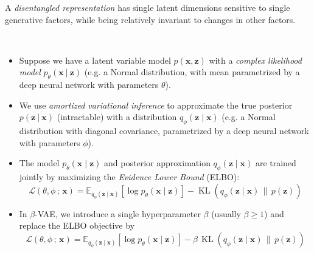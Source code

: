 \documentclass[a0]{a0poster}
\DeclareMathOperator{\KL}{KL}
\def\Head#1{\begin{center}\noindent{\LARGE\bf\color{Black}#1}\end{center}\bigskip}
\begin{document}
\begin{minipage}[t]{0.32\textwidth}
    \Head{Background}
    \vspace{1cm}
    \begin{minipage}{1.0\columnwidth}
    \Large
    A \emph{disentangled representation} has single latent dimensions sensitive to single generative factors, while being relatively invariant to changes in other factors.
    \end{minipage}\\[1.5cm]
    \begin{minipage}{1.0\columnwidth}
    	\Large{}
        \begin{itemize}
        	\item Suppose we have a latent variable model $p(\mathbf{x}, \mathbf{z})$ with a \emph{complex likelihood model} $p_{\theta}(\mathbf{x}\ |\ \mathbf{z})$ (e.g. a Normal distribution, with mean parametrized by a deep neural network with parameters $\theta$).
            \item We use \emph{amortized variational inference} to approximate the true posterior $p(\mathbf{z}\ |\ \mathbf{x})$ (intractable) with a distribution $q_{\phi}(\mathbf{z}\mid \mathbf{x})$ (e.g. a Normal distribution with diagonal covariance, parametrized by a deep neural network with parameters $\phi$).
            \item The model $p_{\theta}(\mathbf{x}\mid \mathbf{z})$ and posterior approximation $q_{\phi}(\mathbf{z}\mid \mathbf{x})$ are trained jointly by maximizing the \emph{Evidence Lower Bound} (ELBO):
            \begin{equation}
            	\mathcal{L}(\theta, \phi\,;\,\mathbf{x}) = \mathbb{E}_{q_{\phi}(\mathbf{z}\mid \mathbf{x})}\left[\log p_{\theta}(\mathbf{x}\mid \mathbf{z})\right] - \KL(q_{\phi}(\mathbf{z}\mid \mathbf{x})\,\|\,p(\mathbf{z}))
            \end{equation}
        \end{itemize}
		\Large{}
		\begin{itemize}
			\item In $\beta$-VAE, we introduce a single hyperparameter $\beta$ (usually $\beta \geq 1$) and replace the ELBO objective by
            \begin{equation}
            	\mathcal{L}(\theta, \phi\,;\,\mathbf{x}) = \mathbb{E}_{q_{\phi}(\mathbf{z}\mid \mathbf{x})}\left[\log p_{\theta}(\mathbf{x}\mid \mathbf{z})\right] - \beta\, \KL(q_{\phi}(\mathbf{z}\mid \mathbf{x})\,\|\,p(\mathbf{z}))
            \end{equation}

\end{itemize}
\end{minipage}
\end{minipage}
\end{document}
